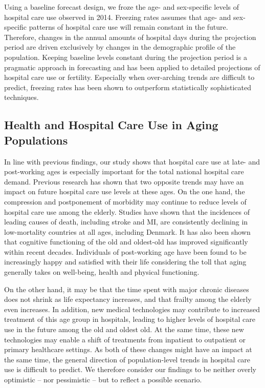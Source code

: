 Using a baseline forecast design, we froze the age- and sex-specific levels of hospital 
care use observed in 2014. Freezing rates assumes that age- and sex-specific patterns 
of hospital care use will remain constant in the future. Therefore, changes in the 
annual amounts of hospital days during the projection period are driven exclusively 
by changes in the demographic profile of the population. Keeping baseline levels 
constant during the projection period is a pragmatic approach in forecasting and 
has been applied to detailed projections of hospital care use\citep{vrhovec2016population} 
or fertility.\citep{bohk2018forecast} Especially when over-arching trends are 
difficult to predict, freezing rates has been shown to outperform statistically 
sophisticated techniques.\citep{bohk2018forecast} \\

\subsection{Health and Hospital Care Use in Aging Populations}

In line with previous findings, our study shows that hospital care use at late- 
and post-working ages is especially important for the total national hospital 
care demand. Previous research has shown that two opposite trends may have an 
impact on future hospital care use levels at these ages. On the one hand, the 
compression and postponement of morbidity may continue to reduce levels of hospital 
care use among the elderly.\citep{vaupel2010biodemography} Studies have shown 
that the incidences of leading causes of death, including stroke and MI, are 
consistently declining in low-mortality countries at all ages, including 
Denmark.\citep{schmidt201225} It has also been shown that cognitive functioning 
of the old and oldest-old has improved significantly within recent decades.\citep{christensen2013physical} 
Individuals of post-working age have been found to be increasingly happy 
and satisfied with their life considering the toll that aging generally 
takes on well-being, health and physical functioning.\citep{vestergaard2015physical}

On the other hand, it may be that the time spent with major chronic diseases 
does not shrink as life expectancy increases, and that frailty among the elderly 
even increases.\citep{clegg2013frailty} In addition, new medical technologies 
may contribute to increased treatment of this age group in hospitals, leading 
to higher levels of hospital care use in the future among the old and oldest 
old.\citep{oksuzyan2013changes} At the same time, these new technologies may 
enable a shift of treatments from inpatient to outpatient or primary healthcare 
settings. As both of these changes might have an impact at the same time, 
the general direction of population-level trends in hospital care use is difficult 
to predict. We therefore consider our findings to be neither overly optimistic -- 
nor pessimistic -- but to reflect a possible scenario.


